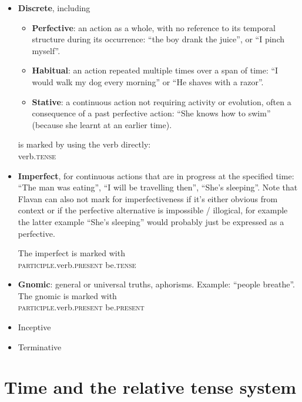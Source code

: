 \documentclass[10pt,oneside]{memoir}
\begin{document}
\begin{multicols}{2}
    \begin{itemize}
        \item \textbf{Discrete}, including 
            \begin{itemize}
                \item \textbf{Perfective}: an action as a whole, with no reference to its temporal structure during its occurrence: ``the boy drank the juice'', or ``I pinch myself''.
                \item \textbf{Habitual}: an action repeated multiple times over a span of time: ``I would walk my dog every morning'' or ``He shaves with a razor''.
                \item \textbf{Stative}: a continuous action not requiring activity or evolution, often a consequence of a past perfective action: ``She knows how to swim'' (because she learnt at an earlier time).
            \end{itemize}
            is marked by using the verb directly:\\
            verb\textsc{.tense}
        \item \textbf{Imperfect}, for continuous actions that are in progress at the specified time: ``The man was eating'', ``I will be travelling then'', ``She's sleeping''. Note that Flavan can also not mark for imperfectiveness if it's either obvious from context or if the perfective alternative is impossible / illogical, for example the latter example ``She's sleeping'' would probably just be expressed as a perfective.
            
            The imperfect is marked with\\
            \textsc{participle}.verb\textsc{.present} be\textsc{.tense}
        \item \textbf{Gnomic}: general or universal truths, aphorisms. Example: ``people breathe''. The gnomic is marked with\\
            \textsc{participle}.verb\textsc{.present} be\textsc{.present}
        \item Inceptive
        \item Terminative
    \end{itemize}

\end{multicols}


\pagebreak




\section{Time and the relative tense system}\label{Time}
\end{document}
